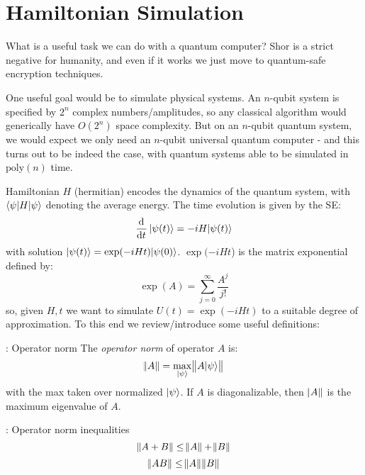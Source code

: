\section{Hamiltonian Simulation}
What is a useful task we can do with a quantum computer? Shor is a strict negative for humanity, and even if it works we just move to quantum-safe encryption techniques.

One useful goal would be to simulate physical systems. An $n$-qubit system is specified by $2^n$ complex numbers/amplitudes, so any classical algorithm would generically have $O(2^n)$ space complexity. But on an $n$-qubit quantum system, we would expect we only need an $n$-qubit universal quantum computer - and this turns out to be indeed the case, with quantum systems able to be simulated in $\text{poly}(n)$ time.

Hamiltonian $H$ (hermitian) encodes the dynamics of the quantum system, with $\langle \psi \rvert H\lvert \psi \rangle$ denoting the average energy. The time evolution is given by the SE:
\begin{equation}
    \dod{}{t}\ket{\psi(t)} = -iH\ket{\psi(t)}
\end{equation}
with solution $\lvert \psi(t) \rangle = \exp(-iHt)\lvert \psi(0) \rangle$. $\exp(-iHt$) is the matrix exponential defined by:
\begin{equation}
    \exp(A) = \sum_{j=0}^\infty \frac{A^j}{j!}
\end{equation}
so, given $H, t$ we want to simulate $U(t) = \exp(-iHt)$ to a suitable degree of approximation. To this end we review/introduce some useful definitions:

\begin{defbox}{: Operator norm}
    The \emph{operator norm} of operator $A$ is:
    \begin{equation}
        \norm{A} = \max_{\lvert \psi \rangle}\norm{A\lvert \psi \rangle}
    \end{equation}
    with the max taken over normalized $\lvert \psi \rangle$. If $A$ is diagonalizable, then $\norm{A}$ is the maximum eigenvalue of $A$.
\end{defbox}

\begin{propbox}{: Operator norm inequalities}
    \begin{equation}
        \norm{A + B} \leq \norm{A} + \norm{B}
    \end{equation}
    \begin{equation}
        \norm{AB} \leq \norm{A}\norm{B}
    \end{equation}
\end{propbox}

